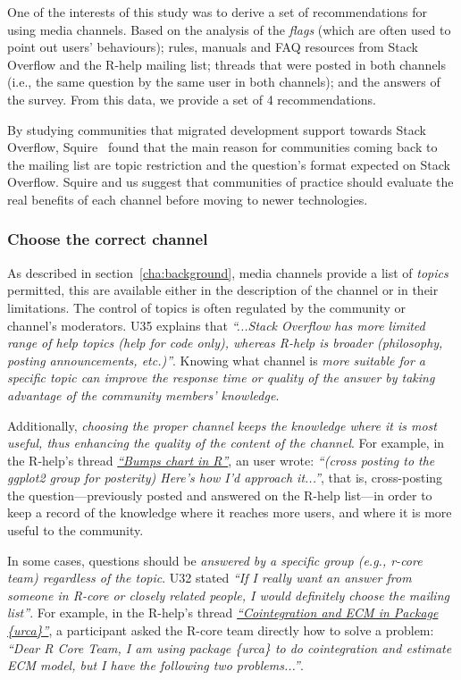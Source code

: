     One of the interests of this study was to derive a set of recommendations for using media channels.
    Based on the analysis of the \textit{flags} (which are often used to point out users' behaviours); rules, manuals and FAQ resources from Stack Overflow and the R-help mailing list; threads that were posted in both channels (i.e., the same question by the same user in both channels); and the answers of the survey.
    From this data, we provide a set of 4 recommendations.

    By studying communities that migrated development support towards Stack Overflow, Squire~\cite{Squire2015a} found that the main reason for communities coming back to the mailing list are topic restriction and the question's format expected on Stack Overflow.
    Squire and us suggest that communities of practice should evaluate the real benefits of each channel before moving to newer technologies.

\subsubsection{Choose the correct channel}

    As described in section~\ref{cha:background}, media channels provide a list of \textit{topics} permitted, this are available either in the description of the channel or in their limitations.
    The control of topics is often regulated by the community or channel's moderators.
    U35 explains that \textit{``...Stack Overflow has more limited range of help topics (help for code only), whereas R-help is broader (philosophy, posting announcements, etc.)''}.
    Knowing what channel is \emph{more suitable for a specific topic can improve the response time or quality of the answer by taking advantage of the community members' knowledge}.

    Additionally, \emph{choosing the proper channel keeps the knowledge where it is most useful, thus enhancing the quality of the content of the channel}.
    For example, in the R-help's thread \textit{\href{http://goo.gl/EJHWrs}{``Bumps chart in R''}}, an user wrote: \textit{``(cross posting to the ggplot2 group for posterity) Here's how I'd approach it...''}, that is, cross-posting the question---previously posted and answered on the R-help list---in order to keep a record of the knowledge where it reaches more users, and where it is more useful to the community.

    In some cases, questions should be \emph{answered by a \textit{specific group} (e.g., r-core team) regardless of the topic}.
    U32 stated \textit{``If I really want an answer from someone in R-core or closely related people, I would definitely choose the mailing list''}.
    For example, in the R-help's thread \textit{\href{http://goo.gl/7olLv7}{``Cointegration and ECM in Package \{urca\}''}}, a participant asked the R-core team directly how to solve a problem: \textit{``Dear R Core Team, I am using package \{urca\} to do cointegration and estimate ECM model, but I have the following two problems...''}.


